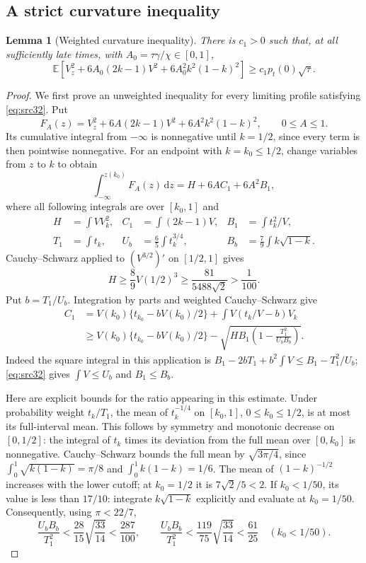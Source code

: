 \documentclass[11pt,a4paper]{article}
\numberwithin{equation}{section}
\newtheorem{lemma}[theorem]{Lemma}
\theoremstyle{definition}
\theoremstyle{remark}
\newcommand{\E}{\mathbb E}
\newcommand{\dd}{\mathrm d}
\begin{document}
\subsection{A strict curvature inequality}

\begin{lemma}[Weighted curvature inequality]\label{lem:scale-curvature}
There is $c_1>0$ such that, at all sufficiently late times, with
$A_0=\tau\gamma/\chi\in[0,1]$,
\begin{equation}\label{eq:src33}
 \E\!\left[V_z^2+6A_0(2k-1)V^2+6A_0^2k^2(1-k)^2\right]
 \ge c_1p_t(0)\sqrt\tau.
\end{equation}
\end{lemma}
\begin{proof}
We first prove an unweighted inequality for every limiting profile
satisfying \eqref{eq:src32}. Put
\[
 F_A(z)=V_z^2+6A(2k-1)V^2+6A^2k^2(1-k)^2,
 \qquad 0\le A\le1.
\]
Its cumulative integral from $-\infty$ is nonnegative until $k=1/2$,
since every term is then pointwise nonnegative. For an endpoint with
$k=k_0\le1/2$, change variables from $z$ to $k$ to obtain
\[
 \int_{-\infty}^{z(k_0)}F_A(z)\,\dd z=H+6AC_1+6A^2B_1,
\]
where all following integrals are over $[k_0,1]$ and
\[
 \begin{aligned}
 H&=\int V V_k^2,& C_1&=\int(2k-1)V,& B_1&=\int t_k^2/V,\\
 T_1&=\int t_k,& U_b&=\frac65\int t_k^{3/4},&
 B_b&=\frac79\int k\sqrt{1-k}.
 \end{aligned}
\]
Cauchy--Schwarz applied to $(V^{3/2})'$ on $[1/2,1]$ gives
\[
 H\ge\frac89 V(1/2)^3\ge\frac{81}{5488\sqrt2}>\frac1{100}.
\]
Put $b=T_1/U_b$. Integration by parts and weighted
Cauchy--Schwarz give
\begin{align*}
 C_1&=V(k_0)\{t_{k_0}-bV(k_0)/2\}
       +\int V(t_k/V-b)V_k\\
 &\ge V(k_0)\{t_{k_0}-bV(k_0)/2\}
       -\sqrt{HB_1\left(1-\frac{T_1^2}{U_bB_b}\right)}.
\end{align*}
Indeed the square integral in this application is
$B_1-2bT_1+b^2\int V\le B_1-T_1^2/U_b$;
\eqref{eq:src32} gives $\int V\le U_b$ and $B_1\le B_b$.

Here are explicit bounds for the ratio appearing in this estimate.
Under probability weight $t_k/T_1$, the mean of $t_k^{-1/4}$ on
$[k_0,1]$, $0\le k_0\le1/2$, is at most its full-interval mean.
This follows by symmetry and monotonic decrease on $[0,1/2]$:
the integral of $t_k$ times its deviation from the full mean over
$[0,k_0]$ is nonnegative. Cauchy--Schwarz bounds the full mean by
$\sqrt{3\pi/4}$, since $\int_0^1\sqrt{k(1-k)}=\pi/8$
and $\int_0^1k(1-k)=1/6$.
The mean of $(1-k)^{-1/2}$ increases with the lower cutoff; at
$k_0=1/2$ it is $7\sqrt2/5<2$.
If $k_0<1/50$, its value is less than $17/10$: integrate
$k\sqrt{1-k}$ explicitly and evaluate at $k_0=1/50$.
Consequently, using $\pi<22/7$,
\[
 \frac{U_bB_b}{T_1^2}<\frac{28}{15}\sqrt{\frac{33}{14}}
       <\frac{287}{100},
 \qquad
 \frac{U_bB_b}{T_1^2}<\frac{119}{75}\sqrt{\frac{33}{14}}
       <\frac{61}{25}\quad(k_0<1/50).
\]


\end{proof}
\end{document}
